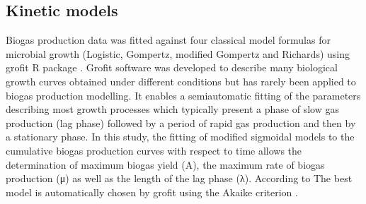 \subsection{Kinetic models}
Biogas production data was fitted against four classical model formulas for microbial growth (Logistic, Gompertz, modified Gompertz and Richards) using grofit R package \cite{Kahm_2010}. Grofit software was developed to describe many biological growth curves obtained under different conditions but has rarely been applied to biogas production modelling. It enables a semiautomatic fitting of the parameters describing most growth processes which typically present a phase of slow gas production (lag phase) followed by a period of rapid gas production and then by a stationary phase. In this study, the fitting of modified sigmoidal models to the cumulative biogas production curves  with respect to time allows the determination of maximum biogas yield (A), the maximum rate of biogas production (μ) as well as the length of the lag phase (λ). According to  The best model is automatically chosen by grofit using the Akaike criterion \cite{Hasenbrink_2006}.